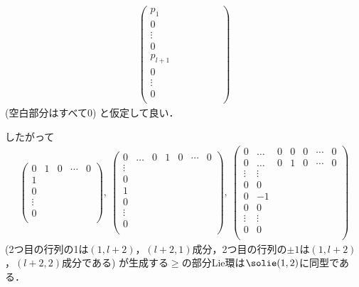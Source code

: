 \begin{npfwn}
\begin{align}
\begin{pmatrix}
      p_1 &  &  &  &  &  &  \\
      0 &  &  &  &  &  &  \\
      \vdots &  &  &  &  &  &  \\
      0&  &  &  &  &  &  \\
      p_{l+1}  &  &  &  &  &  &  \\
      0  &  &  &  &  &  &  \\
      \vdots &  &  &  &  &  &  \\
      0  &  &  &  &  &  &  \\
    \end{pmatrix} \label{eq:X-2}
  \end{align}
  (空白部分はすべて0) と仮定して良い．

  したがって
  \begin{align*}
    \begin{pmatrix}
      0 & 1 & 0 &  \cdots & 0\\
      1 &  &  &    &  \\
      0 &  &    &  &  \\
      \vdots &    &  &  &  \\
      0&  &  &    &  \\
    \end{pmatrix},\
    \begin{pmatrix}
      0 & \hdots & 0 & 1 & 0 &  \cdots & 0\\
      \vdots &  &  &    &  \\
      0 &  &    &  &  \\
      1 &  &    &  &  \\
      0 &  &    &  &  \\
      \vdots &    &  &  &  \\
      0&  &  &    &  \\
    \end{pmatrix},\
    \begin{pmatrix}
      0 & \hdots & 0 & 0 & 0 &  \cdots & 0\\
      0 & \hdots & 0 & 1 & 0 &  \cdots & 0\\
      \vdots & \vdots &  &    &  \\
      0 & 0 &    &  &  \\
      0 &-1  &    &  &  \\
      0 & 0 &    &  &  \\
      \vdots & \vdots   &  &  &  \\
      0& 0 &  &    &  \\
    \end{pmatrix}
  \end{align*}
  (2つ目の行列の1は$(1,l+2)$，$(l+2,1)$成分，2つ目の行列の$\pm 1$は$(1,l+2)$，$(l+2,2)$成分である) が生成する$\ge$の部分Lie環は$\solie(1,2) $に同型である．


\end{npfwn}
